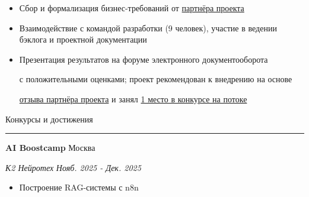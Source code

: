 \documentclass[14pt, a4paper, oneside]{extarticle}
\begin{document}
\begin{itemize}
	\vspace{-2\intextsep}
    \item Сбор и формализация бизнес-требований от \href{https://vk.ru/kearkhipov}{партнёра проекта}
	\vspace{-0.8\intextsep}
    \item Взаимодействие с командой разработки (9 человек), участие в ведении
    бэклога и проектной документации
    \vspace{-0.8\intextsep}
    \item Презентация результатов на форуме электронного документооборота
    
    \vspace{-0.5\intextsep}
    с положительными оценками; проект рекомендован к внедрению на основе
    
    \vspace{-0.5\intextsep}
 	\href{https://github.com/Crazy5202/job_application_form/tree/main/portfolio/EDMS/%D0%9E%D1%82%D0%B7%D1%8B%D0%B2_%D0%B2%D0%BD%D0%B5%D0%B4%D1%80%D0%B5%D0%BD%D0%B8%D0%B5.pdf}{отзыва партнёра проекта} и занял \href{https://github.com/Crazy5202/job_application_form/tree/main/portfolio/EDMS/%D0%9F%D0%BE%D0%B1%D0%B5%D0%B4%D0%B8%D1%82%D0%B5%D0%BB%D1%8C_%D0%A6%D0%9A.pdf}{1 место в конкурсе на потоке}
\end{itemize}


\begin{flushleft}
	\vspace{-\intextsep}
	\large Конкурсы и достижения
\end{flushleft}

\vspace{-0.8\intextsep}
\hrule


\begin{flushleft}
	\vspace{-0.8\intextsep}
	\quad
	\textbf{AI Boostcamp}
	\hfill
	Москва
\end{flushleft}

\begin{flushleft}
	\vspace{-1\intextsep}
	\quad
	\textit{К2 Нейротех}
	\hfill
	\textit{\small Нояб. 2025 - Дек. 2025}
\end{flushleft}


\begin{itemize}
	\vspace{-2\intextsep}
	\item Построение RAG-системы с n8n
\end{itemize}
\end{document}
